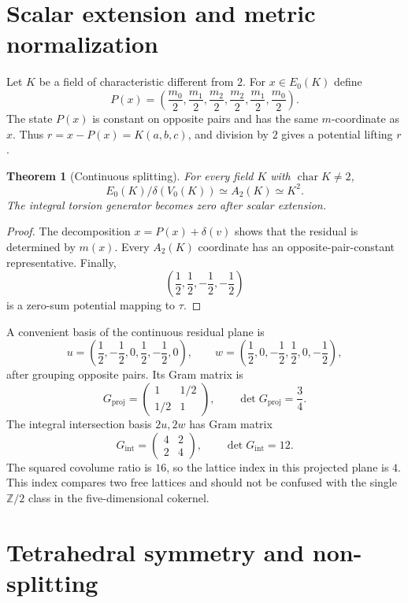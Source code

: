 \documentclass[11pt]{amsart}
\newtheorem{theorem}{Theorem}[section]
\theoremstyle{definition}
\theoremstyle{remark}
\newcommand{\Z}{\mathbb Z}
\begin{document}
\section{Scalar extension and metric normalization}\label{sec:scalar}

Let $K$ be a field of characteristic different from $2$. For $x\in E_0(K)$ define
\[
 P(x)=\left(\frac{m_0}2,\frac{m_1}2,\frac{m_2}2,
             \frac{m_2}2,\frac{m_1}2,\frac{m_0}2\right).
\]
The state $P(x)$ is constant on opposite pairs and has the same $m$-coordinate as $x$. Thus $r=x-P(x)=K(a,b,c)$, and division by $2$ gives a potential lifting $r$.

\begin{theorem}[Continuous splitting]\label{thm:continuous}
For every field $K$ with $\operatorname{char}K\ne2$,
\[
 E_0(K)/\delta(V_0(K))\simeq A_2(K)\simeq K^2.
\]
The integral torsion generator becomes zero after scalar extension.
\end{theorem}

\begin{proof}
The decomposition $x=P(x)+\delta(v)$ shows that the residual is determined by $m(x)$. Every $A_2(K)$ coordinate has an opposite-pair-constant representative. Finally,
\[
 \left(\frac12,\frac12,-\frac12,-\frac12\right)
\]
is a zero-sum potential mapping to $\tau$.
\end{proof}

A convenient basis of the continuous residual plane is
\[
 u=\left(\frac12,-\frac12,0,\frac12,-\frac12,0\right),\qquad
 w=\left(\frac12,0,-\frac12,\frac12,0,-\frac12\right),
\]
after grouping opposite pairs. Its Gram matrix is
\[
G_{\mathrm{proj}}=\begin{pmatrix}1&1/2\\1/2&1\end{pmatrix},
\qquad \det G_{\mathrm{proj}}=\frac34.
\]
The integral intersection basis $2u,2w$ has Gram matrix
\[
G_{\mathrm{int}}=\begin{pmatrix}4&2\\2&4\end{pmatrix},
\qquad \det G_{\mathrm{int}}=12.
\]
The squared covolume ratio is $16$, so the lattice index in this projected plane is $4$. This index compares two free lattices and should not be confused with the single $\Z/2$ class in the five-dimensional cokernel.

\section{Tetrahedral symmetry and non-splitting}\label{sec:symmetry}
\end{document}

